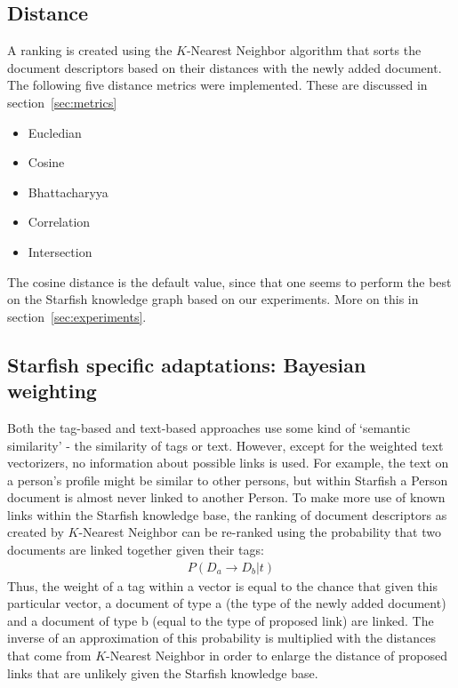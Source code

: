 \subsection{Distance}
A ranking is created using the $K$-Nearest Neighbor algorithm that sorts the
document descriptors based on their distances with the newly added document.
The following five distance metrics were implemented. These are discussed
in section~\ref{sec:metrics}

\begin{itemize}
\item Eucledian
\item Cosine
\item Bhattacharyya
\item Correlation
\item Intersection
\end{itemize}

The cosine distance is the default value, since that one seems to perform the
best on the Starfish knowledge graph based on our experiments. 
More on this in section~\ref{sec:experiments}. 

\subsection{Starfish specific adaptations: Bayesian weighting}
Both the tag-based and text-based approaches use some kind of `semantic similarity' - the similarity of tags or text. However, except for the weighted text vectorizers, no information about possible links is used. For example, the text on a person's profile might be similar to other persons, but within Starfish a Person document is almost never linked to another Person. To make more use of known links within the Starfish knowledge base, the ranking of document descriptors as created by $K$-Nearest Neighbor can be re-ranked using the probability that two documents are linked together given their tags:
\begin{align}
\nonumber P(D_a \rightarrow D_b | t)
\end{align}
Thus, the weight of a tag within a vector is equal to the chance that given this particular vector, a document of type a (the type of the newly added document) and a document of type b (equal to the type of proposed link) are linked. The inverse of an approximation of this probability is multiplied with the distances that come from $K$-Nearest Neighbor in order to enlarge the distance of proposed links that are unlikely given the Starfish knowledge base. 

